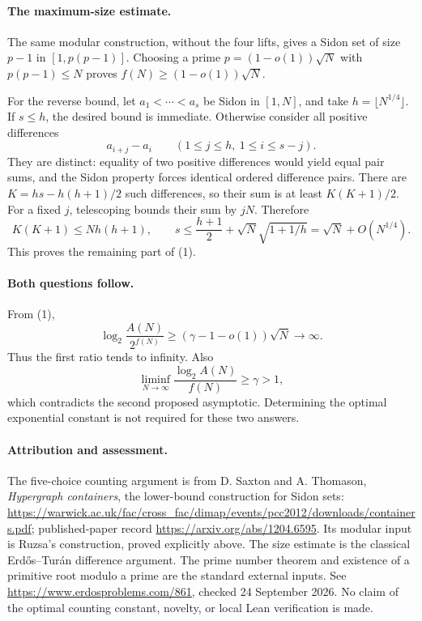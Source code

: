 \paragraph{The maximum-size estimate.}
The same modular construction, without the four lifts, gives a Sidon set of size \(p-1\) in \([1,p(p-1)]\). Choosing a prime \(p=(1-o(1))\sqrt N\) with \(p(p-1)\leq N\) proves \(f(N)\geq(1-o(1))\sqrt N\).

For the reverse bound, let \(a_1<\cdots<a_s\) be Sidon in \([1,N]\), and take \(h=\lfloor N^{1/4}\rfloor\). If \(s\leq h\), the desired bound is immediate. Otherwise consider all positive differences
\[
 a_{i+j}-a_i\qquad(1\leq j\leq h,\ 1\leq i\leq s-j).
\]
They are distinct: equality of two positive differences would yield equal pair sums, and the Sidon property forces identical ordered difference pairs. There are \(K=hs-h(h+1)/2\) such differences, so their sum is at least \(K(K+1)/2\). For a fixed \(j\), telescoping bounds their sum by \(jN\). Therefore
\[
 K(K+1)\leq Nh(h+1),\qquad
 s\leq\frac{h+1}{2}+\sqrt N\sqrt{1+1/h}
 =\sqrt N+O(N^{1/4}).
\tag{3}
\]
This proves the remaining part of (1).

\paragraph{Both questions follow.}
From (1),
\[
 \log_2\frac{A(N)}{2^{f(N)}}
 \geq(\gamma-1-o(1))\sqrt N\longrightarrow\infty.
\]
Thus the first ratio tends to infinity. Also
\[
 \liminf_{N\to\infty}\frac{\log_2A(N)}{f(N)}\geq\gamma>1,
\]
which contradicts the second proposed asymptotic. Determining the optimal exponential constant is not required for these two answers.

\paragraph{Attribution and assessment.}
The five-choice counting argument is from D. Saxton and A. Thomason, \emph{Hypergraph containers}, the lower-bound construction for Sidon sets: \url{https://warwick.ac.uk/fac/cross_fac/dimap/events/pcc2012/downloads/containers.pdf}; published-paper record \url{https://arxiv.org/abs/1204.6595}. Its modular input is Ruzsa's construction, proved explicitly above. The size estimate is the classical Erd\H{o}s--Tur\'an difference argument. The prime number theorem and existence of a primitive root modulo a prime are the standard external inputs. See \url{https://www.erdosproblems.com/861}, checked 24 September 2026. No claim of the optimal counting constant, novelty, or local Lean verification is made.
